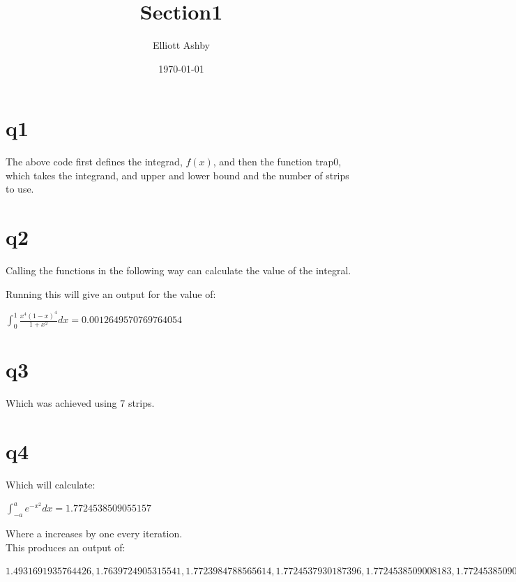 \documentclass[a4paper,english]{article}
\title{Section1}
\author{Elliott Ashby}
\date{\today}
\begin{document}
    \maketitle
    \section{q1}
    
    The above code first defines the integrad, $f(x)$, and then the function trap0, which takes the integrand, and upper and lower bound and the number of strips to use.
    \section{q2}
    Calling the functions in the following way can calculate the value of the integral.
    
    Running this will give an output for the value of:
    \begin{center}
        $\int_0^1{\frac{x^4(1-x)^4}{1+x^2}dx} = 0.0012649570769764054$
    \end{center}
    \section{q3}
    Which was achieved using 7 strips.
    \section{q4}
    
    Which will calculate:
    \begin{center}
            $\int_{-a}^a{e^{-x^2}dx} = 1.7724538509055157$
    \end{center}
    Where a increases by one every iteration. \\
    This produces an output of:
    \begin{center}
         $1.4931691935764426, 1.7639724905315541, 1.7723984788565614, 1.7724537930187396, 1.7724538509008183, 1.7724538509055159, 1.772453850905516, 1.772453850905516, 1.7724538509056167, 1.7724538509055157$
    \end{center}
\end{document}
